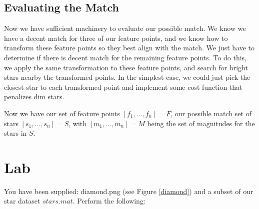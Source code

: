 \documentclass[paper=a4, fontsize=11pt]{scrartcl} %
\begin{document}


\subsection{Evaluating the Match}

Now we have sufficient machinery to evaluate our possible match.  We know we have a decent match for three of our feature points, and we know how to transform these feature points so they best align with the match. We just have to determine if there is decent match for the remaining feature points. To do this, we apply the same transformation to these feature points, and search for bright stars nearby the transformed points. In the simplest case, we could just pick the closest star to each transformed point and implement some cost function that penalizes dim stars.

Now we have our set of feature points $[f_1,\ldots,f_n]=F$, our possible match set of stars $[s_1,\ldots,s_n] = S$, with $[m_1,\ldots,m_n] = M$ being the set of magnitudes for the stars in $S$.




\section{Lab}
You have been supplied: diamond.png (see Figure \ref{diamond}) and a subset of our star dataset $stars.mat$. Perform the following: 
\end{document}
